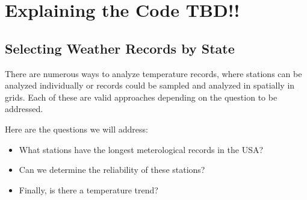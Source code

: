 \documentclass{article}\usepackage[]{graphicx}\usepackage[]{xcolor}
\begin{document}
\section{Explaining the Code TBD!!}

\subsection{Selecting Weather Records by State}

There are numerous ways to analyze temperature records, where stations can be analyzed individually or records could be sampled and analyzed in spatially in grids. Each of these are valid approaches depending on the question to be addressed. 

Here are the questions we will address: 

\begin{itemize}
  \item What stations have the longest meterological records in the USA?
  \item Can we determine the reliability of these stations?
  \item Finally, is there a temperature trend?
\end{itemize}





\end{document}
